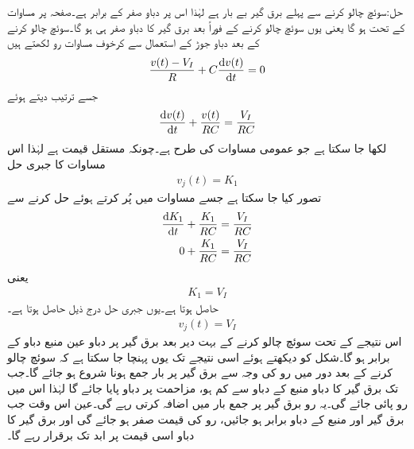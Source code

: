 حل:سوئچ چالو کرنے سے پہلے برق گیر بے بار ہے لہٰذا اس پر دباو صفر کے برابر ہے۔صفحہ  پر مساوات  کے تحت  ہو گا یعنی یوں سوئچ چالو کرنے کے فوراً بعد برق گیر کا دباو صفر ہی ہو گا۔سوئچ چالو کرنے کے بعد  دباو جوڑ  کے استعمال سے کرخوف مساوات رو لکھتے ہیں
\begin{align*}
\frac{v(t)-V_I}{R}+C\frac{\dif v(t)}{\dif t}=0
\end{align*}
جسے ترتیب دیتے ہوئے
\begin{align}\label{مساوات_عارضی_برق_گیر_عارضی_حل_الف}
\frac{\dif v(t)}{\dif t}+\frac{v(t)}{RC}=\frac{V_I}{RC}
\end{align}
لکھا  جا سکتا ہے جو عمومی مساوات  کی طرح ہے۔چونکہ  مستقل قیمت ہے لہٰذا اس مساوات کا جبری حل
\begin{align*}
v_j(t)=K_1
\end{align*}
 تصور کیا جا سکتا ہے جسے  مساوات  میں پُر کرتے ہوئے حل کرنے سے
\begin{align*}
\frac{\dif  K_1}{\dif t}+\frac{K_1}{RC}&=\frac{V_I}{RC}\\
0+\frac{K_1}{RC}&=\frac{V_I}{RC}
\end{align*}
یعنی
\begin{align*}
K_1=V_I
\end{align*}
حاصل ہوتا ہے۔یوں جبری حل درج ذیل حاصل ہوتا ہے۔
\begin{align*}
v_j(t)=V_I
\end{align*}
اس نتیجے کے تحت سوئچ چالو کرنے کے بہت دیر بعد برق گیر پر دباو عین منبع دباو کے برابر ہو گا۔شکل کو دیکھتے ہوئے اسی نتیجے تک یوں پہنچا جا سکتا ہے کہ سوئچ چالو کرنے کے بعد دور میں رو کی وجہ سے برق گیر پر بار جمع ہونا شروع ہو جائے گا۔جب تک برق گیر کا دباو منبع کے دباو سے کم ہو، مزاحمت پر دباو پایا جائے گا لہٰذا اس میں رو پائی جائے گی۔یہ رو برق گیر پر جمع بار میں اضافہ کرتی رہے گی۔عین اس وقت جب برق گیر اور منبع کے دباو برابر ہو جائیں، رو کی قیمت صفر ہو جائے گی اور برق گیر کا دباو اسی قیمت پر ابد تک برقرار رہے گا۔ 

